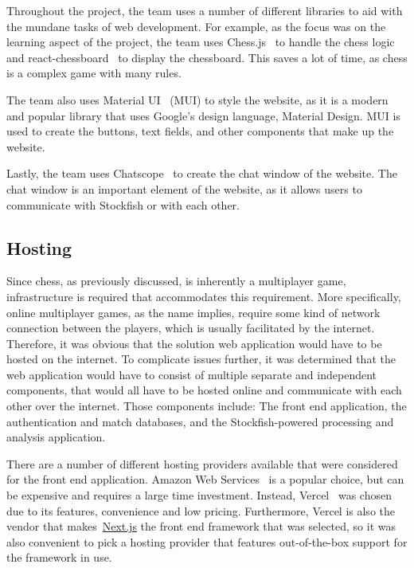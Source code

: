 Throughout the project, the team uses a number of different libraries to aid with the mundane tasks of web development.
For example, as the focus was on the learning aspect of the project, the team uses Chess.js~\cite{chess.js} to handle
the chess logic and react-chessboard~\cite{react-chessboard} to display the chessboard.
This saves a lot of time, as chess is a complex game with many rules.

The team also uses Material UI~\cite{mui} (MUI) to style the website, as it is a modern and popular library that
uses Google's design language, Material Design.
MUI is used to create the buttons, text fields, and other components that make up the website.

Lastly, the team uses Chatscope~\cite{chatscope} to create the chat window of the website.
The chat window is an important element of the website, as it allows users to communicate with Stockfish or with each
other.


\subsection{Hosting}\label{subsec:hosting}

Since chess, as previously discussed, is inherently a multiplayer game,
infrastructure is required that accommodates this requirement.
More specifically, online multiplayer games, as the name implies, require some kind of network connection between the
players, which is usually facilitated by the internet.
Therefore, it was obvious that the solution web application would have to be hosted on the internet.
To complicate issues further, it was determined that the web application would have to consist of multiple separate and
independent components, that would all have to be hosted online and communicate with each other over the internet.
Those components include: The front end application, the authentication and match databases, and the Stockfish-powered
processing and analysis application.

There are a number of different hosting providers available that were considered for the front end application.
Amazon Web Services~\cite{aws} is a popular choice, but can be expensive and requires a large time investment.
Instead, Vercel~\cite{vercel} was chosen due to its features, convenience and low pricing.
Furthermore, Vercel is also the vendor that makes~\url{Next.js} the front end framework that was selected,
so it was also convenient to pick a hosting provider that features out-of-the-box support for the framework in use.

